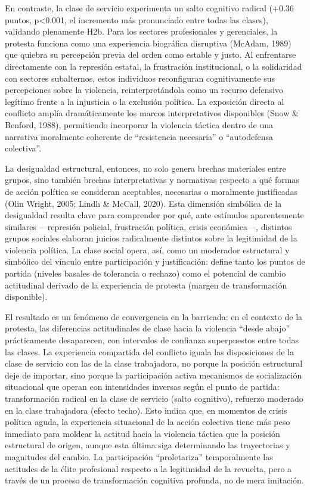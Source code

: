 \documentclass[
  13pt,
]{article}
\begin{document}
En contraste, la clase de servicio experimenta un salto cognitivo
radical (+0.36 puntos, p\textless0.001, el incremento más pronunciado
entre todas las clases), validando plenamente H2b. Para los sectores
profesionales y gerenciales, la protesta funciona como una experiencia
biográfica disruptiva (McAdam, 1989) que quiebra su percepción previa
del orden como estable y justo. Al enfrentarse directamente con la
represión estatal, la frustración institucional, o la solidaridad con
sectores subalternos, estos individuos reconfiguran cognitivamente sus
percepciones sobre la violencia, reinterpretándola como un recurso
defensivo legítimo frente a la injusticia o la exclusión política. La
exposición directa al conflicto amplía dramáticamente los marcos
interpretativos disponibles (Snow \& Benford, 1988), permitiendo
incorporar la violencia táctica dentro de una narrativa moralmente
coherente de ``resistencia necesaria'' o ``autodefensa colectiva''.

La desigualdad estructural, entonces, no solo genera brechas materiales
entre grupos, sino también brechas interpretativas y normativas respecto
a qué formas de acción política se consideran aceptables, necesarias o
moralmente justificadas (Olin Wright, 2005; Lindh \& McCall, 2020). Esta
dimensión simbólica de la desigualdad resulta clave para comprender por
qué, ante estímulos aparentemente similares ---represión policial,
frustración política, crisis económica---, distintos grupos sociales
elaboran juicios radicalmente distintos sobre la legitimidad de la
violencia política. La clase social opera, así, como un moderador
estructural y simbólico del vínculo entre participación y justificación:
define tanto los puntos de partida (niveles basales de tolerancia o
rechazo) como el potencial de cambio actitudinal derivado de la
experiencia de protesta (margen de transformación disponible).

El resultado es un fenómeno de convergencia en la barricada: en el
contexto de la protesta, las diferencias actitudinales de clase hacia la
violencia ``desde abajo'' prácticamente desaparecen, con intervalos de
confianza superpuestos entre todas las clases. La experiencia compartida
del conflicto iguala las disposiciones de la clase de servicio con las
de la clase trabajadora, no porque la posición estructural deje de
importar, sino porque la participación activa mecanismos de
socialización situacional que operan con intensidades inversas según el
punto de partida: transformación radical en la clase de servicio (salto
cognitivo), refuerzo moderado en la clase trabajadora (efecto techo).
Esto indica que, en momentos de crisis política aguda, la experiencia
situacional de la acción colectiva tiene más peso inmediato para moldear
la actitud hacia la violencia táctica que la posición estructural de
origen, aunque esta última siga determinando las trayectorias y
magnitudes del cambio. La participación ``proletariza'' temporalmente
las actitudes de la élite profesional respecto a la legitimidad de la
revuelta, pero a través de un proceso de transformación cognitiva
profunda, no de mera imitación.
\end{document}
